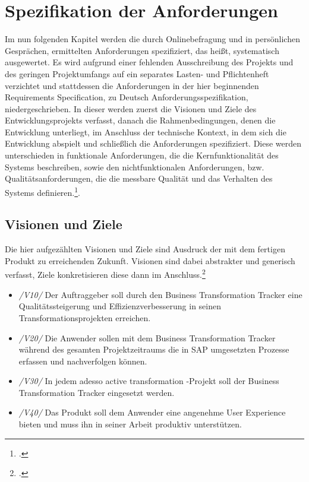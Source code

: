 \section{Spezifikation der Anforderungen}
Im nun folgenden Kapitel werden die durch Onlinebefragung und in persönlichen Gesprächen, ermittelten Anforderungen spezifiziert, das heißt, systematisch ausgewertet. Es wird aufgrund einer fehlenden Ausschreibung des Projekts und des geringen Projektumfangs auf ein separates Lasten- und Pflichtenheft verzichtet und stattdessen die Anforderungen in der hier beginnenden \glqq{}Requirements Specification\grqq{}, zu Deutsch \glqq{}Anforderungsspezifikation\grqq{}, niedergeschrieben. In dieser werden zuerst die Visionen und Ziele des Entwicklungsprojekts verfasst, danach die Rahmenbedingungen, denen die Entwicklung unterliegt, im Anschluss der technische Kontext, in dem sich die Entwicklung abspielt und schließlich die Anforderungen spezifiziert. Diese werden unterschieden in funktionale Anforderungen, die die Kernfunktionalität des Systems beschreiben, sowie den nichtfunktionalen Anforderungen, bzw. Qualitätsanforderungen, die die messbare Qualität und das Verhalten des Systems definieren.\footcite[Vgl.][S. 492 ff.]{balzert}. 

\subsection{Visionen und Ziele}
Die hier aufgezählten Visionen und Ziele sind Ausdruck der mit dem fertigen Produkt zu erreichenden Zukunft. Visionen sind dabei abstrakter und generisch verfasst, Ziele konkretisieren diese dann im Anschluss.\footcite[Vgl.][S. 457]{balzert}
\begin{itemize}
    \item[] \emph{/V10/} Der Auftraggeber soll durch den Business Transformation Tracker eine Qualitätssteigerung und Effizienzverbesserung in seinen Transformationsprojekten erreichen.
    \item[] \emph{/V20/} Die Anwender sollen mit dem Business Transformation Tracker während des gesamten Projektzeitraums die in SAP umgesetzten Prozesse erfassen und nachverfolgen können.
    \item[] \emph{/V30/} In jedem adesso active transformation -Projekt soll der Business Transformation Tracker eingesetzt werden.
    \item[] \emph{/V40/} Das Produkt soll dem Anwender eine angenehme User Experience bieten und muss ihn in seiner Arbeit produktiv unterstützen.\\
\end{itemize}

